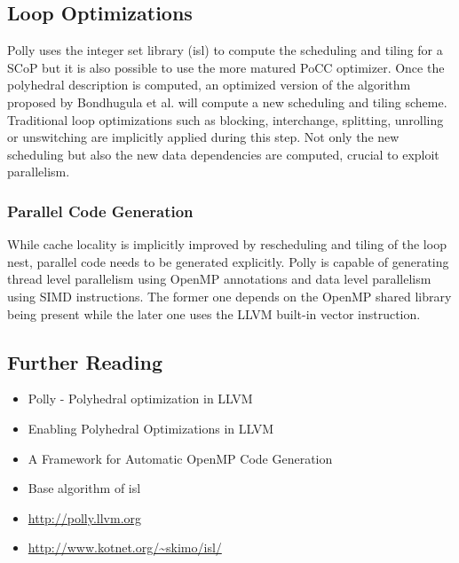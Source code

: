 \subsection{Loop Optimizations}
Polly uses the integer set library (isl) to compute the scheduling and
tiling for a SCoP but it is also possible to use the more matured PoCC optimizer.
Once the polyhedral description is computed, an optimized version of the 
algorithm proposed by Bondhugula et al.\cite{Bondhugula:2008:PAP:1379022.1375595}
will compute a new scheduling and tiling scheme.
Traditional loop
optimizations such as blocking, interchange, splitting, unrolling or unswitching 
are implicitly applied during this step. 
Not only the new scheduling but also the new data dependencies are computed, 
crucial to exploit parallelism.



\subsubsection{Parallel Code Generation}
While cache locality is implicitly improved by rescheduling and tiling 
of the loop nest,  parallel code needs to be generated explicitly.
Polly is capable of generating
thread level parallelism using OpenMP annotations and data level parallelism 
using SIMD instructions. The former one depends on the OpenMP shared library 
being present while the later one uses the LLVM built-in vector instruction.




\subsection*{Further Reading}

\yellow
\begin{itemize}
  \item Polly - Polyhedral optimization in LLVM \cite{grosser.11.impact}  
  \item Enabling Polyhedral Optimizations in LLVM \cite{grosser:thesis}
  \item A Framework for Automatic OpenMP Code Generation \cite{raghesh2011framework}
  \item Base algorithm of isl \cite{Bondhugula:2008:PAP:1379022.1375595}
  \item \url{http://polly.llvm.org} \nocite{Polly:Online}
  \item \url{http://www.kotnet.org/~skimo/isl/} \nocite{ISL:Online}
\end{itemize}





